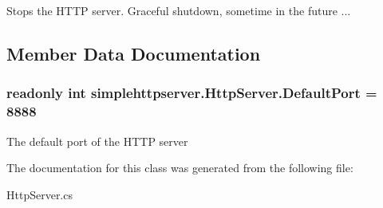 Stops the H\-T\-T\-P server. Graceful shutdown, sometime in the future ... 



\subsection{Member Data Documentation}
\hypertarget{classsimplehttpserver_1_1_http_server_a0d9eff72dd06e826458091b66fbf1226}{
\subsubsection[{Default\-Port}]{\setlength{\rightskip}{0pt plus 5cm}readonly int simplehttpserver.\-Http\-Server.\-Default\-Port = 8888\hspace{0.3cm}{\ttfamily [static]}}}\label{classsimplehttpserver_1_1_http_server_a0d9eff72dd06e826458091b66fbf1226}


The default port of the H\-T\-T\-P server 



The documentation for this class was generated from the following file\-:\begin{DoxyCompactItemize}
\item 
Http\-Server.\-cs\end{DoxyCompactItemize}
